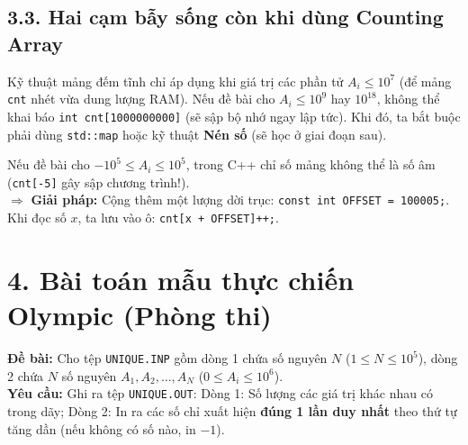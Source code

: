 \documentclass[11pt,a4paper]{article}
\begin{document}
\subsection*{\color{AsianBlue}\small 3.3. Hai cạm bẫy sống còn khi dùng Counting Array}

\begin{tcolorbox}[colback=red!5!white,colframe=red!75!black,arc=1.5mm,title=\textbf{\small 1. GIỚI HẠN GIÁ TRỊ PHẦN TỬ TRONG BỘ NHỚ RAM}]
\footnotesize
Kỹ thuật mảng đếm tĩnh chỉ áp dụng khi giá trị các phần tử $A_i \le 10^7$ (để mảng \texttt{cnt} nhét vừa dung lượng RAM). Nếu đề bài cho $A_i \le 10^9$ hay $10^{18}$, không thể khai báo \texttt{int cnt[1000000000]} (sẽ sập bộ nhớ ngay lập tức). Khi đó, ta bắt buộc phải dùng \texttt{std::map} hoặc kỹ thuật \textbf{Nén số} (sẽ học ở giai đoạn sau).
\end{tcolorbox}

\vspace{-0.15cm}
\begin{tcolorbox}[colback=AsianLightBlue,colframe=AsianBlue,arc=1.5mm,title=\textbf{\small 2. KỸ THUẬT DỜI TRỤC TỌA ĐỘ (OFFSET) KHI DÃY CÓ SỐ ÂM}]
\footnotesize
Nếu đề bài cho $-10^5 \le A_i \le 10^5$, trong C++ chỉ số mảng không thể là số âm (\texttt{cnt[-5]} gây sập chương trình!).\\
$\Longrightarrow$ \textbf{Giải pháp:} Cộng thêm một lượng dời trục: \texttt{const int OFFSET = 100005;}. Khi đọc số $x$, ta lưu vào ô: \texttt{cnt[x + OFFSET]++;}.
\end{tcolorbox}

\newpage
\enlargethispage{2\baselineskip}
\section*{\color{AsianDarkBlue}\normalsize 4. Bài toán mẫu thực chiến Olympic (Phòng thi)}

\vspace{-0.15cm}
\begin{tcolorbox}[colback=white,colframe=AsianDarkBlue,arc=1.5mm,title=\textbf{\small BÀI TOÁN: PHẦN TỬ ĐỘC NHẤT (UNIQUE.INP / UNIQUE.OUT)}]
\footnotesize
\textbf{Đề bài:} Cho tệp \texttt{UNIQUE.INP} gồm dòng 1 chứa số nguyên $N$ ($1 \le N \le 10^5$), dòng 2 chứa $N$ số nguyên $A_1, A_2, \dots, A_N$ ($0 \le A_i \le 10^6$).\\
\textbf{Yêu cầu:} Ghi ra tệp \texttt{UNIQUE.OUT}:
Dòng 1: Số lượng các giá trị khác nhau có trong dãy; Dòng 2: In ra các số chỉ xuất hiện \textbf{đúng 1 lần duy nhất} theo thứ tự tăng dần (nếu không có số nào, in $-1$).
\end{tcolorbox}
\end{document}

